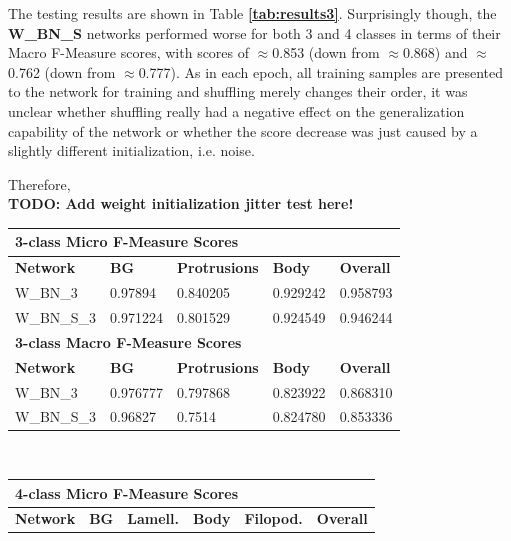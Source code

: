 The testing results are shown in Table \textbf{\ref{tab:results3}}. Surprisingly though, the \textbf{W\_BN\_S} networks performed worse for both 3 and 4 classes in terms of their Macro F-Measure scores, with scores of $\approx$0.853 (down from $\approx$0.868) and $\approx$0.762 (down from $\approx$0.777). As in each epoch, all training samples are presented to the network for training and shuffling merely changes their order, it was unclear whether shuffling really had a negative effect on the generalization capability of the network or whether the score decrease was just caused by a slightly different initialization, i.e. noise.

Therefore, \\
\textbf{TODO: Add weight initialization jitter test here!}


\begin {table}
	\begin{flushleft}
		\begin {tabular}[!htb]{|l|l|l|l|l|}
			\hline\multicolumn{5}{|l|}{\textbf{3-class Micro F-Measure Scores}} \\ \hline
			\textbf{Network}& \textbf{BG}& \textbf{Protrusions}& \textbf{Body}& \textbf{Overall} \\ \hline
			W\_BN\_3& \cellcolor{green!25}0.97894& \cellcolor{green!25}0.840205& \cellcolor{green!25}0.929242& \cellcolor{green!25}0.958793 \\ \hline
			W\_BN\_S\_3& 0.971224& 0.801529& 0.924549& 0.946244 \\ \hline
			\multicolumn{5}{|l|}{\textbf{3-class Macro F-Measure Scores}} \\ \hline
			\textbf{Network}& \textbf{BG}& \textbf{Protrusions}& \textbf{Body}& \textbf{Overall} \\ \hline
			W\_BN\_3& \cellcolor{green!25}0.976777& \cellcolor{green!25}0.797868& 0.823922& \cellcolor{green!25}0.868310 \\ \hline
			W\_BN\_S\_3& 0.96827& 0.7514& \cellcolor{green!25}0.824780& 0.853336 \\ \hline
		\end {tabular}
		\vspace{0.5cm}\\
		\begin {tabular}[!htb]{|l|l|l|l|l|l|}
			\hline\multicolumn{6}{|l|}{\textbf{4-class Micro F-Measure Scores}} \\ \hline
			\textbf{Network}& \textbf{BG}& \textbf{Lamell.}& \textbf{Body}& \textbf{Filopod.}& \textbf{Overall} \\ \hline

\end{tabular}
\end{flushleft}
\end{table}
